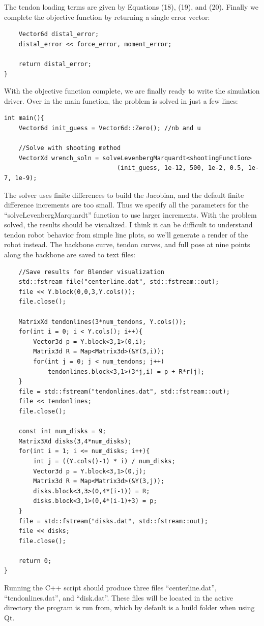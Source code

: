 \documentclass[12pt]{article}
\begin{document}
The tendon loading terms are given by Equations (18), (19), and (20). Finally we complete the objective function by returning a single error vector:
\begin{lstlisting}
    Vector6d distal_error;
    distal_error << force_error, moment_error;

    return distal_error;
}
\end{lstlisting}

With the objective function complete, we are finally ready to write the simulation driver. Over in the main function, the problem is solved in just a few lines:
\begin{lstlisting}
int main(){
    Vector6d init_guess = Vector6d::Zero(); //nb and u

    //Solve with shooting method
    VectorXd wrench_soln = solveLevenbergMarquardt<shootingFunction>
                               (init_guess, 1e-12, 500, 1e-2, 0.5, 1e-7, 1e-9);
\end{lstlisting}
The solver uses finite differences to build the Jacobian, and the default finite difference increments are too small. Thus we specify all the parameters for the ``solveLevenbergMarquardt'' function to use larger increments. With the problem solved, the results should be visualized. I think it can be difficult to understand tendon robot behavior from simple line plots, so we'll generate a render of the robot instead. The backbone curve, tendon curves, and full pose at nine points along the backbone are saved to text files:
\begin{lstlisting}
    //Save results for Blender visualization
    std::fstream file("centerline.dat", std::fstream::out);
    file << Y.block(0,0,3,Y.cols());
    file.close();

    MatrixXd tendonlines(3*num_tendons, Y.cols());
    for(int i = 0; i < Y.cols(); i++){
        Vector3d p = Y.block<3,1>(0,i);
        Matrix3d R = Map<Matrix3d>(&Y(3,i));
        for(int j = 0; j < num_tendons; j++)
            tendonlines.block<3,1>(3*j,i) = p + R*r[j];
    }
    file = std::fstream("tendonlines.dat", std::fstream::out);
    file << tendonlines;
    file.close();
		
    const int num_disks = 9;
    Matrix3Xd disks(3,4*num_disks);
    for(int i = 1; i <= num_disks; i++){
        int j = ((Y.cols()-1) * i) / num_disks;
        Vector3d p = Y.block<3,1>(0,j);
        Matrix3d R = Map<Matrix3d>(&Y(3,j));
        disks.block<3,3>(0,4*(i-1)) = R;
        disks.block<3,1>(0,4*(i-1)+3) = p;
    }
    file = std::fstream("disks.dat", std::fstream::out);
    file << disks;
    file.close();

    return 0;
}
\end{lstlisting}
Running the C++ script should produce three files ``centerline.dat'', ``tendonlines.dat'', and ``disk.dat''. These files will be located in the active directory the program is run from, which by default is a build folder when using Qt.
\end{document}
